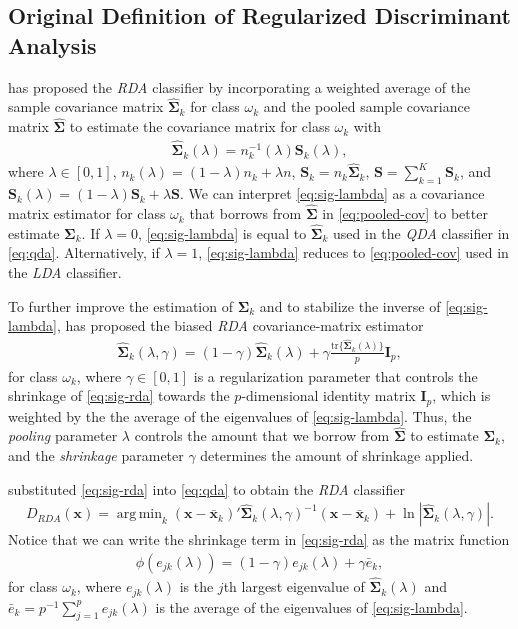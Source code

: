 \documentclass[11pt]{article}
\newcommand{\xbar}{\bar{\bm x}}
\newcommand{\tr}{\text{tr}}
\DeclareMathOperator*{\argmin}{arg\,min}
\begin{document}
\subsection{Original Definition of Regularized Discriminant Analysis}

\cite{Friedman:1989tm} has proposed the \emph{RDA} classifier by incorporating a weighted average of the sample covariance matrix $\widehat{\bm \Sigma}_k$ for class $\omega_k$ and the pooled sample covariance matrix $\widehat{\bm\Sigma}$ to estimate the covariance matrix for class $\omega_k$ with
\begin{align}
  \widehat{\bm\Sigma}_k(\lambda) = n_k^{-1}(\lambda) \bm S_k(\lambda),\label{eq:sig-lambda}
\end{align}
where $\lambda \in [0, 1]$, $n_k(\lambda) = (1 - \lambda) n_k + \lambda n$, $\bm S_k = n_k \widehat{\bm\Sigma}_k$, $\bm S = \sum_{k=1}^K \bm S_k$, and $\bm S_k(\lambda) = (1 - \lambda) \bm S_k + \lambda \bm S$. We can interpret \eqref{eq:sig-lambda} as a covariance matrix estimator for class $\omega_k$ that borrows from $\widehat{\bm\Sigma}$ in \eqref{eq:pooled-cov} to better estimate $\bm \Sigma_k$. If $\lambda = 0$, \eqref{eq:sig-lambda} is equal to $\widehat{\bm\Sigma}_k$ used in the \emph{QDA} classifier in \eqref{eq:qda}. Alternatively, if $\lambda = 1$, \eqref{eq:sig-lambda} reduces to \eqref{eq:pooled-cov} used in the \emph{LDA} classifier.

To further improve the estimation of $\bm \Sigma_k$ and to stabilize the inverse of \eqref{eq:sig-lambda}, \cite{Friedman:1989tm} has proposed the biased \emph{RDA} covariance-matrix estimator
\begin{align}
	\widehat{\bm\Sigma}_k(\lambda, \gamma) = (1 - \gamma) \widehat{\bm\Sigma}_k(\lambda) + \gamma \frac{\tr\{\widehat{\bm\Sigma}_k(\lambda)\}}{p} \bm I_p,\label{eq:sig-rda}
\end{align}
for class $\omega_k$, where $\gamma \in [0, 1]$ is a regularization parameter that controls the shrinkage of \eqref{eq:sig-rda}  towards the $p$-dimensional identity matrix $\bm I_p$, which is weighted by the the average of the eigenvalues of \eqref{eq:sig-lambda}. Thus, the \emph{pooling} parameter $\lambda$ controls the amount that we borrow from $\widehat{\bm\Sigma}$ to estimate $\bm \Sigma_k$, and the \emph{shrinkage} parameter $\gamma$ determines the amount of shrinkage applied.

\cite{Friedman:1989tm} substituted \eqref{eq:sig-rda} into \eqref{eq:qda} to obtain the \emph{RDA} classifier
\begin{align}
	D_{RDA}(\bm x) = \argmin_{k}  (\bm x - \xbar_k)'\widehat{\bm\Sigma}_k(\lambda, \gamma)^{-1}(\bm x - \xbar_k)  + \ln |\widehat{\bm\Sigma}_k(\lambda, \gamma)|. \label{eq:rda}
\end{align}
Notice that we can write the shrinkage term in \eqref{eq:sig-rda} as the matrix function
\begin{align*}
	\phi(e_{jk}(\lambda)) = (1 - \gamma) e_{jk}(\lambda) + \gamma \bar{e}_k,
\end{align*}
for class $\omega_k$, where $e_{jk}(\lambda)$ is the $j$th largest eigenvalue of $\widehat{\bm\Sigma}_k(\lambda)$ and $\bar{e}_k = p^{-1} \sum_{j=1}^p e_{jk}(\lambda)$ is the average of the eigenvalues of \eqref{eq:sig-lambda}.
\end{document}
